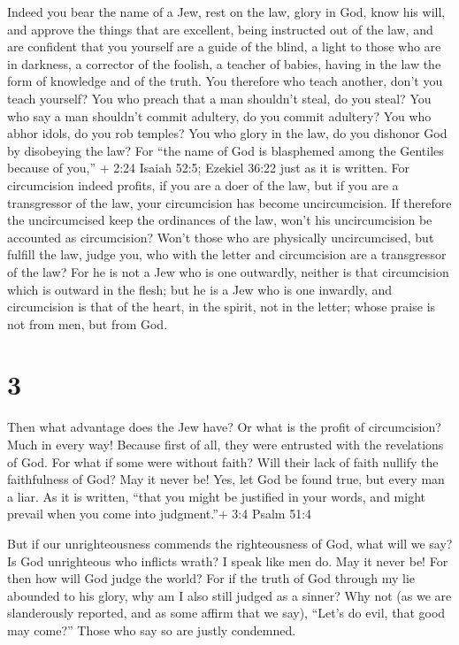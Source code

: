  Indeed you bear the name of a Jew, rest on the law, glory
in God,  know his will, and approve the things that are
excellent, being instructed out of the law,  and are
confident that you yourself are a guide of the blind, a light to those
who are in darkness,  a corrector of the foolish, a teacher
of babies, having in the law the form of knowledge and of the truth.
 You therefore who teach another, don't you teach yourself?
You who preach that a man shouldn't steal, do you steal? 
You who say a man shouldn't commit adultery, do you commit adultery? You
who abhor idols, do you rob temples?  You who glory in the
law, do you dishonor God by disobeying the law?  For ``the
name of God is blasphemed among the Gentiles because of you,'' + 2:24
Isaiah 52:5; Ezekiel 36:22 just as it is written.  For
circumcision indeed profits, if you are a doer of the law, but if you
are a transgressor of the law, your circumcision has become
uncircumcision.  If therefore the uncircumcised keep the
ordinances of the law, won't his uncircumcision be accounted as
circumcision?  Won't those who are physically
uncircumcised, but fulfill the law, judge you, who with the letter and
circumcision are a transgressor of the law?  For he is not
a Jew who is one outwardly, neither is that circumcision which is
outward in the flesh;  but he is a Jew who is one inwardly,
and circumcision is that of the heart, in the spirit, not in the letter;
whose praise is not from men, but from God.

\hypertarget{section-2}{%
\section{3}\label{section-2}}

 Then what advantage does the Jew have? Or what is the
profit of circumcision?  Much in every way! Because first of
all, they were entrusted with the revelations of God.  For
what if some were without faith? Will their lack of faith nullify the
faithfulness of God?  May it never be! Yes, let God be found
true, but every man a liar. As it is written, ``that you might be
justified in your words, and might prevail when you come into
judgment.''+ 3:4 Psalm 51:4

 But if our unrighteousness commends the righteousness of
God, what will we say? Is God unrighteous who inflicts wrath? I speak
like men do.  May it never be! For then how will God judge
the world?  For if the truth of God through my lie abounded
to his glory, why am I also still judged as a sinner?  Why
not (as we are slanderously reported, and as some affirm that we say),
``Let's do evil, that good may come?'' Those who say so are justly
condemned.

